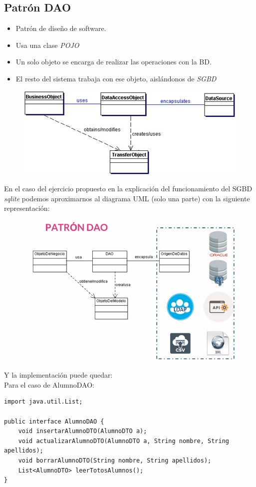 \documentclass[4paper]{article}
\begin{document}
\subsection{Patrón DAO}
\begin{itemize}
\item Patrón de diseño de software.
\item Usa una clase \emph{POJO}
\item Un solo objeto se encarga de realizar las operaciones con la BD.
\item El resto del sistema trabaja con ese objeto, aislándonos de \emph{SGBD}
\end{itemize}
\begin{figure}[H]
\centering
\includegraphics[scale=0.8]{imagenes/DAO.jpg}
\end{figure}
En el caso del ejercicio propuesto en la explicación del funcionamiento del SGBD \emph{sqlite} podemos aproximarnos al diagrama UML (solo una parte) con la siguiente representación:
\begin{figure}[H]
\centering
\includegraphics[scale=0.7]{imagenes/DAO.png}
\end{figure}
\newpage
Y la implementación puede quedar:\\
Para el caso de AlumnoDAO:
\begin{lstlisting}
import java.util.List;

public interface AlumnoDAO {
    void insertarAlumnoDTO(AlumnoDTO a);
    void actualizarAlumnoDTO(AlumnoDTO a, String nombre, String apellidos);
    void borrarAlumnoDTO(String nombre, String apellidos);
    List<AlumnoDTO> leerTotosAlumnos();
}
\end{lstlisting}
\end{document}
